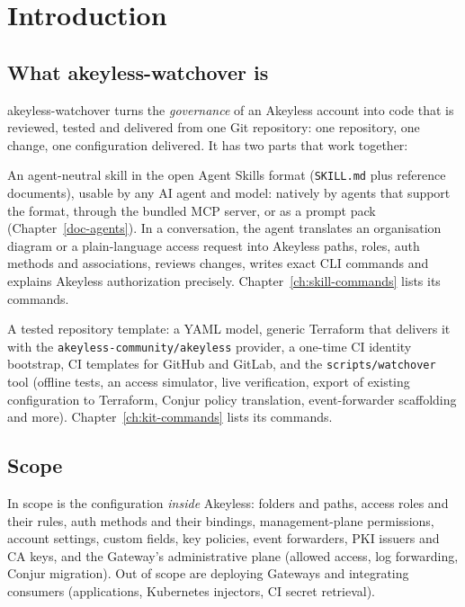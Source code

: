 \chapter{Introduction}\label{ch:introduction}

\section{What akeyless-watchover is}
akeyless-watchover turns the \emph{governance} of an Akeyless account into code that is
reviewed, tested and delivered from one Git repository: one repository, one change, one
configuration delivered. It has two parts that work together:

\begin{description}[style=nextline,leftmargin=1.5em]
\item[The skill] An agent-neutral skill in the open Agent Skills format (\texttt{SKILL.md} plus
  reference documents), usable by any AI agent and model: natively by agents that support the
  format, through the bundled MCP server, or as a prompt pack (Chapter~\ref{doc-agents}). In a
  conversation, the agent translates an organisation diagram or a plain-language access request into Akeyless
  paths, roles, auth methods and associations, reviews changes, writes exact CLI commands and
  explains Akeyless authorization precisely. Chapter~\ref{ch:skill-commands} lists its commands.
\item[The kit] A tested repository template: a YAML model, generic Terraform that delivers it with
  the \texttt{akeyless-community/akeyless} provider, a one-time CI identity bootstrap, CI templates
  for GitHub and GitLab, and the \texttt{scripts/watchover} tool (offline tests, an access
  simulator, live verification, export of existing configuration to Terraform, Conjur policy
  translation, event-forwarder scaffolding and more). Chapter~\ref{ch:kit-commands} lists its commands.
\end{description}

\section{Scope}
In scope is the configuration \emph{inside} Akeyless: folders and paths, access roles and their
rules, auth methods and their bindings, management-plane permissions, account settings, custom
fields, key policies, event forwarders, PKI issuers and CA keys, and the Gateway's administrative
plane (allowed access, log forwarding, Conjur migration). Out of scope are deploying Gateways and
integrating consumers (applications, Kubernetes injectors, CI secret retrieval).

